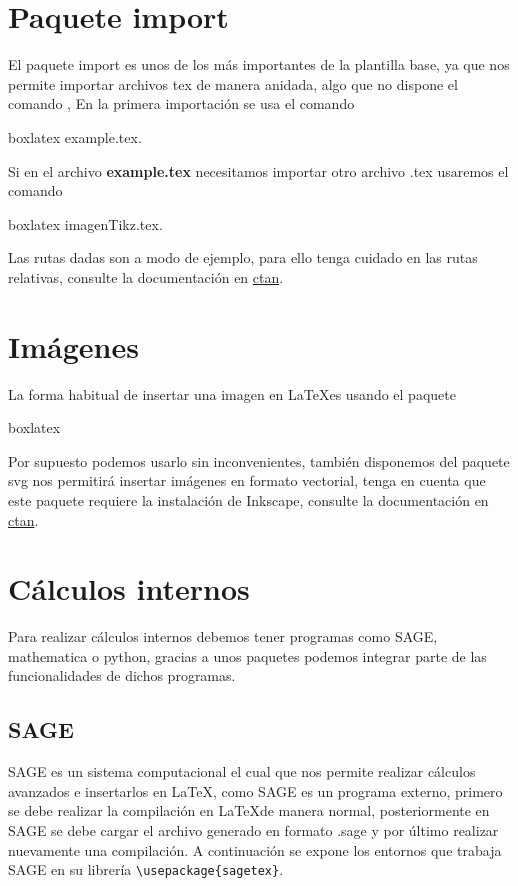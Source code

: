 {	\section{Paquete import}
	El paquete import es unos de los más importantes de la plantilla base, ya que nos permite importar archivos tex de manera anidada, algo que no dispone el comando \verb||, En la primera importación se usa el comando 
	\begin{tcblisting}{boxlatex}
		{example.tex}.
	\end{tcblisting}
	Si en el archivo \textbf{example.tex} necesitamos importar otro archivo .tex usaremos el comando 
	\begin{tcblisting}{boxlatex}
		{imagenTikz.tex}.
	\end{tcblisting}
	\begin{boxbasic}[Nota]
		Las rutas dadas son a modo de ejemplo, para ello tenga cuidado en las rutas relativas, consulte la documentación en \href{https://www.ctan.org/pkg/import}{ctan}. 
	\end{boxbasic}
	\section{Imágenes}
	La forma habitual de insertar una imagen en \LaTeX\space es usando el paquete
	\begin{tcblisting}{boxlatex}
		\usepackage{graphicx}
	\end{tcblisting}
	Por supuesto podemos usarlo sin inconvenientes, también disponemos del paquete svg nos permitirá insertar imágenes en formato vectorial, tenga en cuenta que este paquete requiere la instalación de Inkscape, consulte la documentación en \href{https://www.ctan.org/pkg/svg}{ctan}.
	\section{Cálculos internos}
	Para realizar cálculos internos debemos tener programas como SAGE, mathematica o python, gracias a unos paquetes podemos integrar parte de las funcionalidades de dichos programas.
	\subsection{SAGE}
	SAGE es un sistema computacional el cual que nos permite realizar cálculos avanzados e insertarlos en \LaTeX, como SAGE es un programa externo, primero se debe realizar la compilación en \LaTeX\space de manera normal, posteriormente en SAGE se debe cargar el archivo generado en formato .sage y por último realizar nuevamente una compilación. A continuación se expone los entornos que trabaja SAGE en su librería \verb|\usepackage{sagetex}|.
}
